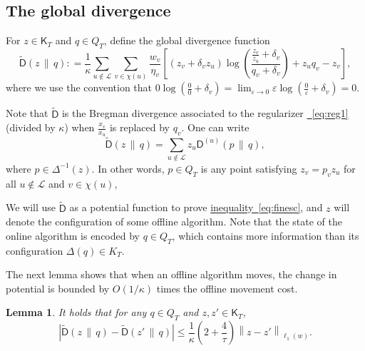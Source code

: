 \documentclass[11pt]{article}
\numberwithin{equation}{section}
\newtheorem{lemma}[theorem]{Lemma}
\theoremstyle{definition}
\theoremstyle{plain}
\newcommand{\expeqref}[2]{\hyperref[#2]{#1~\eqref{#2}}}
\newcommand{\calL}{\mathcal L}
\newcommand{\dmid}{\,\|\,}
\newcommand{\eps}{\varepsilon}
\newcommand{\seteq}{\mathrel{\mathop:}=}
\newcommand{\sfD}{\mathsf D}
\newcommand{\sfK}{\mathsf K}
\newcommand{\tilD}{\tilde{\sfD}}
\begin{document}
\subsection{The global divergence}

For $z \in \sfK_T$ and $q \in Q_T$, 
define the global divergence function
\[
\tilD(z \dmid q) \seteq \frac1{\kappa} \sum_{u \notin \calL} \sum_{v \in \chi(u)} \frac{w_v}{\eta_v} \left[ \left(z_v + \delta_v z_u\right) \log \left(\frac{\frac{z_v}{z_u}+\delta_v}{q_v+\delta_v}\right)
+ z_u q_v - z_v\right]
,
\]
where we use the convention 
that $0 \log \left(\frac{0}{0}+\delta_v\right) = \lim_{\eps \to 0} \eps \log \left(\frac{0}{\eps}+\delta_v\right) = 0$. 

Note that $\tilD$ is the Bregman divergence associated to the regularizer \expeqref{\!}{eq:reg1} (divided by $\kappa$) when $\frac{x_v}{x_{u}}$ is replaced by $q_v$. 
One can write
\[
   \tilD(z \dmid q) = \sum_{u \notin \calL} z_u\sfD^{(u)}\!\left(p \dmid q\right),
\]
where $p\in \Delta^{-1}(z)$. 
In other words, $p \in Q_T$ is any point satisfying $z_v=p_vz_u$ for all $u \notin \calL$ and $v\in\chi(u)$,

%

We will use $\tilD$ as a potential function to prove \expeqref{inequality}{eq:finesc},
and $z$ will denote the configuration of some offline algorithm.
Note that the state of the online algorithm is encoded by $q \in Q_T$, which contains
more information than its configuration $\Delta(q) \in K_T$.

The next lemma shows that when an offline algorithm moves, the change in potential is bounded by $O(1/\kappa)$ times the offline movement cost.

\begin{lemma}\label{lem:lipschitz}
	It holds that for any $q \in Q_T$ and $z,z' \in \sfK_T$,
	\[
	\left|\tilD(z \dmid q) - \tilD(z' \dmid q)\right| \leq \frac{1}{\kappa} \left(2+\frac{4}{\tau}\right) \left\|z-z'\right\|_{\ell_1(w)}.
	\]
\end{lemma}
\end{document}
